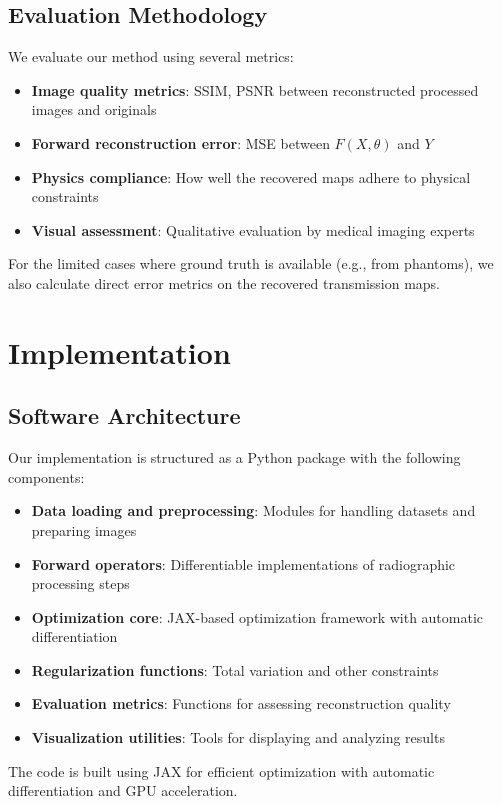 \documentclass[nomenclature, english, bibtex]{kththesis}
\numberwithin{listing}{chapter}
\begin{document}
\section{Evaluation Methodology}
We evaluate our method using several metrics:
\begin{itemize}
    \item \textbf{Image quality metrics}: SSIM, PSNR between reconstructed processed images and originals
    \item \textbf{Forward reconstruction error}: MSE between $F(X, \theta)$ and $Y$
    \item \textbf{Physics compliance}: How well the recovered maps adhere to physical constraints
    \item \textbf{Visual assessment}: Qualitative evaluation by medical imaging experts
\end{itemize}

For the limited cases where ground truth is available (e.g., from phantoms), we also calculate direct error metrics on the recovered transmission maps.
\chapter{Implementation}

\section{Software Architecture}
Our implementation is structured as a Python package with the following components:
\begin{itemize}
    \item \textbf{Data loading and preprocessing}: Modules for handling datasets and preparing images
    \item \textbf{Forward operators}: Differentiable implementations of radiographic processing steps
    \item \textbf{Optimization core}: JAX-based optimization framework with automatic differentiation
    \item \textbf{Regularization functions}: Total variation and other constraints
    \item \textbf{Evaluation metrics}: Functions for assessing reconstruction quality
    \item \textbf{Visualization utilities}: Tools for displaying and analyzing results
\end{itemize}

The code is built using JAX for efficient optimization with automatic differentiation and GPU acceleration.
\end{document}
